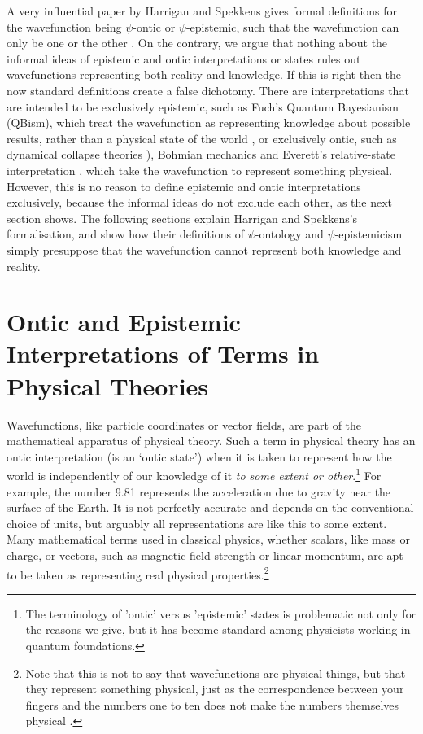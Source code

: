 \documentclass[superscriptaddress, floatfix,nofootinbib,12pt]{revtex4-2}
\begin{document}
A very influential paper by Harrigan and Spekkens gives formal definitions for the wavefunction being $\psi$-ontic or $\psi$-epistemic, such that the wavefunction can only be one or the other \cite{Harrigan2010Nonlocality}. On the contrary, we argue that nothing about the informal ideas of epistemic and ontic interpretations or states rules out wavefunctions representing both reality and knowledge. If this is right then the now standard definitions create a false dichotomy. There are interpretations that are intended to be exclusively epistemic, such as Fuch's Quantum Bayesianism (QBism), which treat the wavefunction as representing knowledge about possible results, rather than a physical state of the world \cite{Fuchs2002Info,Fuchs2014QBism}, or exclusively ontic, such as dynamical collapse theories \cite{Penrose1996Gravity, Ghirardi1986Unified}), Bohmian mechanics \cite{Bohm1952Suggested} and Everett's relative-state interpretation \cite{Everett1957Relative}, which take the wavefunction to represent something physical. However, this is no reason to define epistemic and ontic interpretations exclusively, because the informal ideas do not exclude each other, as the next section shows. The following sections explain Harrigan and Spekkens's formalisation, and show how their definitions of $\psi$-ontology and $\psi$-epistemicism simply presuppose that the wavefunction cannot represent both knowledge and reality.

\section{Ontic and Epistemic Interpretations of Terms in Physical Theories}

Wavefunctions, like particle coordinates or vector fields, are part of the mathematical apparatus of physical theory. Such a term in physical theory has an ontic interpretation (is an `ontic state') when it is taken to represent how the world is independently of our knowledge of it \emph{to some extent or other}.\footnote{The terminology of 'ontic' versus 'epistemic' states is problematic not only for the reasons we give, but it has become standard among physicists working in quantum foundations.} For example, the number 9.81 represents the acceleration due to gravity near the surface of the Earth. It is not perfectly accurate and depends on the conventional choice of units, but arguably all representations are like this to some extent. Many mathematical terms used in classical physics, whether scalars, like mass or charge, or vectors, such as magnetic field strength or linear momentum, are apt to be taken as representing real physical properties.\footnote{Note that this is not to say that wavefunctions are physical things, but that they represent something physical, just as the correspondence between your fingers and the numbers one to ten does not make the numbers themselves physical \cite{Wallace2010StateRealism,Schlosshauer2012Implications,Hermens2021Howreal}.}
\end{document}
